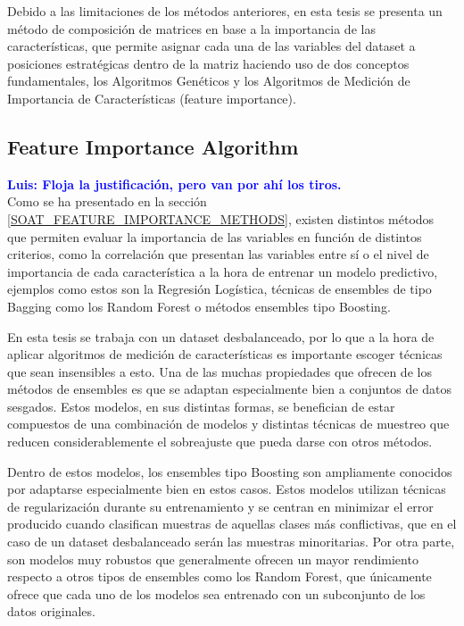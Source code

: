 \documentclass{uathesis-es}
\begin{document}
Debido a las limitaciones de los métodos anteriores, en esta tesis se presenta un método de composición de matrices en base a la importancia de las características, que permite asignar cada una de las variables del dataset a posiciones estratégicas dentro de la matriz haciendo uso de dos conceptos fundamentales, los Algoritmos Genéticos y los Algoritmos de Medición de Importancia de Características (feature importance).




\subsection{Feature Importance Algorithm}

\textcolor{blue}{\textbf{Luis: Floja la justificación, pero van por ahí los tiros.}}\\

Como se ha presentado en la sección \ref{SOAT_FEATURE_IMPORTANCE_METHODS}, existen distintos métodos que permiten evaluar la importancia de las variables en función de distintos criterios, como la correlación que presentan las variables entre sí o el nivel de importancia de cada característica a la hora de entrenar un modelo predictivo, ejemplos como estos son la Regresión Logística, técnicas de ensembles de tipo Bagging como los Random Forest o métodos ensembles tipo Boosting.


En esta tesis se trabaja con un dataset desbalanceado, por lo que a la hora de aplicar algoritmos de medición de características es importante escoger técnicas que sean insensibles a esto. Una de las muchas propiedades que ofrecen de los métodos de ensembles es que se adaptan especialmente bien a conjuntos de datos sesgados. Estos modelos, en sus distintas formas, se benefician de estar compuestos de una combinación de modelos y distintas técnicas de muestreo que reducen considerablemente el sobreajuste que pueda darse con otros métodos.

Dentro de estos modelos, los ensembles tipo Boosting son ampliamente conocidos por adaptarse especialmente bien en estos casos. Estos modelos utilizan técnicas de regularización durante su entrenamiento y se centran en minimizar el error producido cuando clasifican muestras de aquellas clases más conflictivas, que en el caso de un dataset desbalanceado serán las muestras minoritarias. Por otra parte, son modelos muy robustos que generalmente ofrecen un mayor rendimiento respecto a otros tipos de ensembles como los Random Forest, que únicamente ofrece que cada uno de los modelos sea entrenado con un subconjunto de los datos originales.
\end{document}
